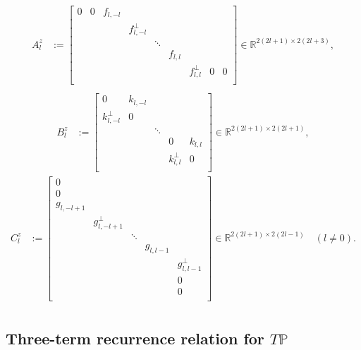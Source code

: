 \documentclass[11pt, oneside]{article}   	%
\newcommand{\R}{\mathbb{R}}
\newcommand{\gradP}{T\mathbb{P}}
\begin{document}
\begin{align}
A^z_l &:= \begin{bmatrix}
		0 & 0 & f_{l,-l} \\
		& & & f^\perp_{l,-l} \\
		& & & & \ddots \\
		& & & & & f_{l,l} \\
		& & & & & & f^\perp_{l,l} & 0 & 0 \\
	    \end{bmatrix} \in \R^{2(2l+1)\times2(2l+3)}, \\
\end{align}
\begin{align}
B^z_l &:= \begin{bmatrix}
		0 & k_{l,-l} \\
		k^\perp_{l,-l} & 0 \\
		& & \ddots \\
		& & & 0 & k_{l,l} \\
		& & & k^\perp_{l,l} & 0 \\
	\end{bmatrix}  \in \R^{2(2l+1)\times2(2l+1)}, 
\end{align}
\begin{align}
C^z_l &:= \begin{bmatrix}
		0 \\
		0 \\
		g_{l,-l+1} \\
		& g^\perp_{l,-l+1} \\
		& & \ddots \\
		& & & g_{l,l-1} \\
		& & & & g^\perp_{l,l-1} \\
		& & & & 0 \\
		& & & & 0 \\
	    \end{bmatrix} \in \R^{2(2l+1)\times2(2l-1)} \quad (l \ne 0). \\
\end{align}



\subsection{Three-term recurrence relation for \(\gradP\)}
\end{document}

